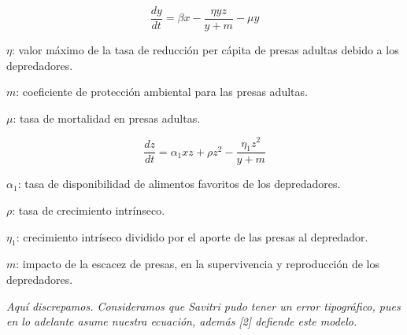\documentclass{beamer}
\begin{document}
\begin{frame}
    {\bf $$\frac{dy}{dt} = \beta x-\frac{\eta yz}{y+m}-\mu y$$}

    $\eta$: valor máximo de la tasa de reducción per cápita de presas adultas debido a los depredadores.
    \vspace*{0.3cm}

    $m$: coeficiente de protección ambiental para las presas adultas.
    \vspace*{0.3cm}

    $\mu$: tasa de mortalidad en presas adultas.
\end{frame}

\begin{frame}
    {\bf $$\frac{dz}{dt} = \alpha_1 xz+\rho z^2-\frac{\eta_1z^2}{y+m}$$}


    $\alpha_1$: tasa de disponibilidad de alimentos favoritos de los depredadores.

    $\rho$: tasa de crecimiento intrínseco.








    $\eta_1$: crecimiento intríseco dividido por el aporte de las presas al depredador.

    $m$: impacto de la escacez de presas, en la supervivencia y reproducción de los depredadores.
    \vspace*{0.7cm}

    {\it\scriptsize Aquí discrepamos. Consideramos que Savitri pudo tener un error tipográfico, pues en lo adelante asume nuestra
    ecuación, además [2] defiende este modelo.}

\end{frame}
\end{document}
